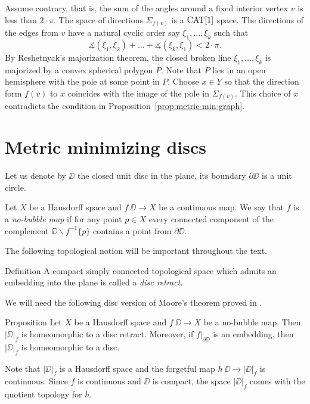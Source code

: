\documentclass[a4paper,10pt]{amsart}
\begin{document}
Assume contrary, that is, 
the sum of the angles around a fixed interior vertex $v$ is less than $2\cdot\pi$.
The space of directions $\Sigma_{f(v)}$ is a $\mathop{\rm CAT}\nolimits[1]$ space.
The directions of the edges from $v$ have a natural
cyclic order say $\xi_1,\dots,\xi_k$
such that
\[\measuredangle(\xi_1,\xi_2)+\dots+\measuredangle(\xi_k,\xi_1)<2\cdot\pi.\]
By Reshetnyak's majorization theorem,
the closed broken line $\xi_1,\dots,\xi_k$ is majorized by a convex spherical polygon $P$.
Note that $P$ lies in an open hemisphere with the pole  at some point in $P$.
Choose $x\in Y$ so that the direction form $f(v)$ to $x$ coincides with the image of the pole in $\Sigma_{f(v)}$.
This choice of $x$ contradicts the condition in Proposition~\ref{prop:metric-min-graph}.\qeds







\section{Metric minimizing discs}



Let us denote by $\DD$ the closed unit disc in the plane,
its boundary $\partial \DD$ is a unit circle.

Let $X$ be a Hausdorff space and
$f\:\DD\to X$ be a continuous map.
We say that $f$ is a \emph{no-bubble map}
if for any point $p\in X$ every connected component of the complement $\DD\backslash f^{-1}\{p\}$ contains a point from $\partial \DD$.

The following topological notion will be important throughout the text.

\begin{thm}{Definition}
A compact simply connected topological space which admits an embedding into the plane is 
called a \emph{disc retract}. 
\end{thm}




We will need the following disc version of Moore's theorem proved in \cite{moore}.

\begin{thm}{Proposition}\label{prop:disc-moore}
Let $X$ be a Hausdorff space and
$f\:\DD\to X$ be a no-bubble map.
Then $|\DD|_f$ is homeomorphic to a disc retract. Moreover, if $f|_{\partial\DD}$ is 
an embedding, then $|\DD|_f$ is homeomorphic to a disc.
\end{thm}


Note that $|\DD|_f$ is a Hausdorff space
and the forgetful map $h\:\DD\to |\DD|_f$ is continuous.
Since $f$ is continuous and $\DD$ is compact, the space $|\DD|_f$ comes with the quotient topology for $h$. 
\end{document}
